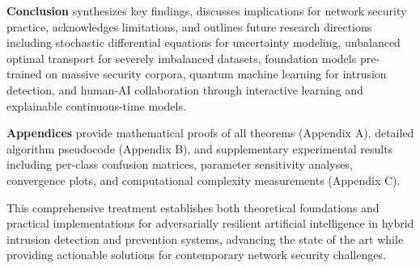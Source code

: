 \textbf{Conclusion} synthesizes key findings, discusses implications for network security practice, acknowledges limitations, and outlines future research directions including stochastic differential equations for uncertainty modeling, unbalanced optimal transport for severely imbalanced datasets, foundation models pre-trained on massive security corpora, quantum machine learning for intrusion detection, and human-AI collaboration through interactive learning and explainable continuous-time models.

\textbf{Appendices} provide mathematical proofs of all theorems (Appendix A), detailed algorithm pseudocode (Appendix B), and supplementary experimental results including per-class confusion matrices, parameter sensitivity analyses, convergence plots, and computational complexity measurements (Appendix C).

This comprehensive treatment establishes both theoretical foundations and practical implementations for adversarially resilient artificial intelligence in hybrid intrusion detection and prevention systems, advancing the state of the art while providing actionable solutions for contemporary network security challenges.
